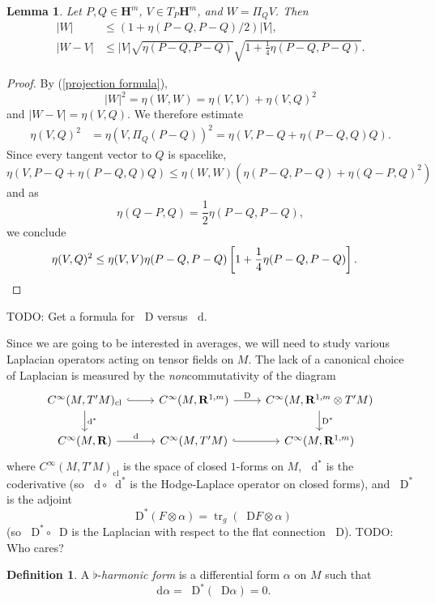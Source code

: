 \documentclass[reqno,12pt,letterpaper]{amsart}
\newcommand{\RR}{\mathbf{R}}
\newcommand{\Hyp}{\mathbf H}
\newcommand{\tr}{\operatorname{tr}}
\newcommand*\dif{\mathop{}\!\mathrm{d}}
\newcommand*\Dif{\mathop{}\!\mathrm{D}}
\newcommand{\dfn}[1]{\emph{#1}\index{#1}}
\newtheorem{lemma}[theorem]{Lemma}
\theoremstyle{definition}
\newtheorem{definition}[theorem]{Definition}
\numberwithin{equation}{section}
\begin{document}
\begin{lemma}
    Let $P, Q \in \Hyp^m$, $V \in T_P\Hyp^m$, and $W = \Pi_Q V$. Then
\begin{align*}
    |W| &\leq (1 + \eta(P - Q, P - Q)/2)|V|, \\
    |W - V| &\leq |V|\sqrt{\eta(P - Q, P - Q)} \sqrt{1 + \frac{1}{4} \eta(P - Q, P - Q)}.
\end{align*}
\end{lemma}
\begin{proof}
By (\ref{projection formula}),
$$|W|^2 = \eta(W, W) = \eta(V, V) + \eta(V, Q)^2$$
and $|W - V| = \eta(V, Q)$.
We therefore estimate
\begin{align*}
\eta(V, Q)^2 &= \eta(V, \Pi_Q(P - Q))^2 = \eta(V, P - Q + \eta(P - Q, Q)Q).
\end{align*}
Since every tangent vector to $Q$ is spacelike,
$$\eta(V, P - Q + \eta(P - Q, Q)Q) \leq \eta(W, W)(\eta(P - Q, P - Q) + \eta(Q - P, Q)^2)$$
and as
$$\eta(Q - P, Q) = \frac{1}{2}\eta(P - Q, P - Q),$$
we conclude
\begin{align*}
\eta(V, Q)^2 &\leq \eta(V, V) \eta(P - Q, P - Q) \left[1 + \frac{1}{4} \eta(P - Q, P - Q)\right]. \qedhere
\end{align*}
\end{proof}

TODO: Get a formula for $\Dif$ versus $\dif$.

Since we are going to be interested in averages, we will need to study various Laplacian operators acting on tensor fields on $M$.
The lack of a canonical choice of Laplacian is measured by the \emph{non}commutativity of the diagram
$$\begin{tikzcd}
C^\infty(M, T'M)_{\mathrm{cl}} \arrow[hookrightarrow]{r} \arrow["\dif^*"]{d} &
C^\infty(M, \RR^{1, m}) \arrow["\Dif"]{r} &
C^\infty(M, \RR^{1, m} \otimes T'M) \arrow["\Dif^*"]{d} \\
C^\infty(M, \RR) \arrow["\dif"]{r} &
C^\infty(M, T'M) \arrow[hookrightarrow]{r} &
C^\infty(M, \RR^{1, m})
\end{tikzcd}$$
where $C^\infty(M, T'M)_{\mathrm{cl}}$ is the space of closed $1$-forms on $M$, $\dif^*$ is the coderivative (so $\dif \circ \dif^*$ is the Hodge-Laplace operator on closed forms), and $\Dif^*$ is the adjoint
$$\Dif^* (F \otimes \alpha) = \tr_g (\Dif F \otimes \alpha)$$
(so $\Dif^* \circ \Dif$ is the Laplacian with respect to the flat connection $\Dif$).
TODO: Who cares?

\begin{definition}
A $\flat$-\dfn{harmonic form} is a differential form $\alpha$ on $M$ such that
$$\dif \alpha = \Dif^* (\Dif \alpha) = 0.$$
\end{definition}
\end{document}
